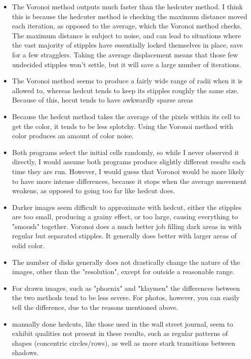 \documentclass[11pt]{article}
\begin{document}
	\begin{itemize}
	\item The Voronoi method outputs much faster than the hedcuter method. I think this is because the hedcuter method is checking the maximum distance moved each iteration, as opposed to the average, which the Voronoi method checks. The maximum distance is subject to noise, and can lead to situations where the vast majority of stipples have essentially locked themselves in place, save for a few stragglers. Taking the average displacement means that those few undecided stipples won't settle, but it will save a large number of iterations.
	\item The Voronoi method seems to produce a fairly wide range of radii when it is allowed to, whereas hedcut tends to keep its stipples roughly the same size. Because of this, hecut tends to have awkwardly sparse areas 
	\item Because the hedcut method takes the average of the pixels within its cell to get the color, it tends to be less splotchy. Using the Voronoi method with color produces an amount of color noise.
	\item Both programs select the initial cells randomly, so while I never observed it directly, I would assume both programs produce slightly different results each time they are run. However, I would guess that Voronoi would be more likely to have more intense differences, because it stops when the average movement weakens, as opposed to going too far like hedcut does.
	\item Darker images seem difficult to approximate with hedcut, either the stipples are too small, producing a grainy effect, or too large, causing everything to "smoosh" together. Voronoi does a much better job filling dark areas in with regular but separated stipples. It generally does better with larger areas of solid color.
	\item The number of disks generally does not drastically change the nature of the images, other than the "resolution", except for outside a reasonable range.
	\item For drawn images, such as "phoenix" and "klaymen" the differences between the two methods tend to be less severe. For photos, however, you can easily tell the difference, due to the reasons mentioned above.
	\item manually done hedcuts, like those used in the wall street journal, seem to exhibit qualities not present in these results, such as regular patterns of shapes (concentric circles/rows), as well as more stark transitions between shadows.
	\end{itemize}
\end{document}
